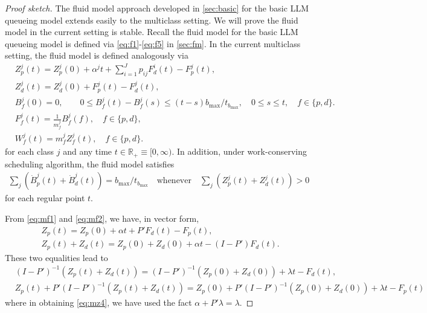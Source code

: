 \documentclass[11pt]{article}
\theoremstyle{plain}
\theoremstyle{definition}
\theoremstyle{remark}
\newcommand{\R}{\mathbb{R}}
\begin{document}
\begin{proof}[Proof sketch]
The fluid model approach  developed in \cref{sec:basic} for the basic LLM queueing model extends easily to the multiclass setting. We will prove the fluid model in the current setting is stable.
Recall the  fluid model 
for the basic LLM queueing model is defined via \cref{eq:f1}-\cref{eq:f5} in \cref{sec:fm}. In the current multiclass setting, the fluid model is defined analogously via
\begin{align}
  &  Z^j_p(t)=Z^j_p(0)+ \alpha^j t + \sum_{i=1}^J p_{ij} F^i_d(t)- F^j_p(t), \label{eq:mf1} \\
  &  Z^j_d(t)= Z^j_d(0)+  F^j_p(t) - F^j_d(t),\label{eq:mf2} \\
  & B^j_f(0)=0, \qquad 0\le  B^j_f(t )-B^j_f(s) \le (t-s) b_{\max}/t_{b_{\max}}, \quad 0\le  s\le  t,
    \quad f\in\{p, d\}.\label{eq:mf3}\\
  &   F^j_f(t) = \frac{1}{ m^j_f }B^j_f(f), \quad f\in \{p, d\}, \label{eq:mf4} \\
  &   W^j_f(t) = m^j_f Z^j_f(t), \quad f\in \{p, d\}.   \label{eq:mf5}   
\end{align}
for each class $j$ and any time $t\in \R_+\equiv[0, \infty)$.
In addition, under work-conserving scheduling algorithm, the fluid model satisfies
\begin{align}
\sum_j(\dot B^j_p(t) + \dot B^j_d(t))=b_{\max}/t_{b_{\max}} \quad \text{whenever}
\quad \sum_j(Z^j_p(t)+Z^j_d(t))>0
\end{align}
for each regular point $t$.

From \cref{eq:mf1} and \cref{eq:mf2}, 
we have, in vector form, 
\begin{align*}
    &Z_p(t) = Z_p(0) + \alpha t + P' F_d(t) - F_p(t),\\
    &Z_p(t)+Z_d(t) = Z_p(0)+Z_d(0) + \alpha t - (I-P') F_d(t).
\end{align*}
These two equalities lead to 
\begin{align}\label{eq:mz3}
  &(I-P')^{-1} ( Z_p(t)+Z_d(t)) = (I-P')^{-1}(Z_p(0)+Z_d(0)) + \lambda t -  F_d(t), \\
  & Z_p(t)+P'(I-P')^{-1} ( Z_p(t)+Z_d(t)) = Z_p(0)+P'(I-P')^{-1} ( Z_p(0)+Z_d(0)) + \lambda t - F_p(t) \label{eq:mz4}
\end{align} 
where in obtaining \cref{eq:mz4}, we have used the fact $\alpha +P'\lambda=\lambda$.


\end{proof}
\end{document}
